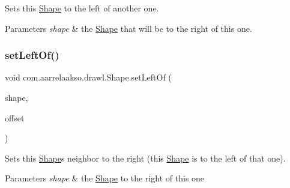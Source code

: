 Sets this \hyperlink{classcom_1_1aarrelaakso_1_1drawl_1_1_shape}{Shape} to the left of another one. 


\begin{DoxyParams}{Parameters}
{\em shape} & the \hyperlink{classcom_1_1aarrelaakso_1_1drawl_1_1_shape}{Shape} that will be to the right of this one. \\
\hline
\end{DoxyParams}
\mbox{\label{classcom_1_1aarrelaakso_1_1drawl_1_1_shape_a8012a3823982d77b563ef61787ccb523}} 
\subsubsection{\texorpdfstring{set\+Left\+Of()}{setLeftOf()}\hspace{0.1cm}{\footnotesize\ttfamily [2/2]}}
{\footnotesize\ttfamily void com.\+aarrelaakso.\+drawl.\+Shape.\+set\+Left\+Of (\begin{DoxyParamCaption}\item[{@Not\+Null final \hyperlink{classcom_1_1aarrelaakso_1_1drawl_1_1_shape}{Shape}}]{shape,  }\item[{@Not\+Null final \hyperlink{classcom_1_1aarrelaakso_1_1drawl_1_1_measure}{Measure}}]{offset }\end{DoxyParamCaption})\hspace{0.3cm}{\ttfamily [inherited]}}



Sets this \hyperlink{classcom_1_1aarrelaakso_1_1drawl_1_1_shape}{Shape}\textquotesingle{}s neighbor to the right (this \hyperlink{classcom_1_1aarrelaakso_1_1drawl_1_1_shape}{Shape} is to the left of that one). 


\begin{DoxyParams}{Parameters}
{\em shape} & the \hyperlink{classcom_1_1aarrelaakso_1_1drawl_1_1_shape}{Shape} to the right of this one \\
\hline
\end{DoxyParams}
\mbox{\label{classcom_1_1aarrelaakso_1_1drawl_1_1_shape_a3cada5e03bd1552a79702d2945c7ed01}} 
